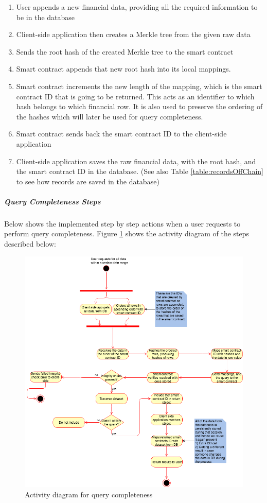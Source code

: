 \begin{enumerate}
	\item User appends a new financial data, providing all the required information to be in the database
	\item Client-side application then creates a Merkle tree from the given raw data
	\item Sends the root hash of the created Merkle tree to the smart contract
	\item Smart contract appends that new root hash into its local mappings.
	\item Smart contract increments the new length of the mapping, which is the smart contract ID that is going to be returned. This acts as an identifier to which hash belongs to which financial row. It is also used to preserve the ordering of the hashes which will later be used for query completeness.
	\item Smart contract sends back the smart contract ID to the client-side application
	\item Client-side application saves the raw financial data, with the root hash, and the smart contract ID in the database. (See also Table \ref{table:recordsOffChain} to see how records are saved in the database)
\end{enumerate}

\subparagraph{Query Completeness Steps}
Below shows the implemented step by step actions when a user requests to perform query completeness. Figure \ref{fig:queryCompleteness} shows the activity diagram of the steps described below:

\begin{figure}[h]
	\centering
	\includegraphics[width=1.0\textwidth]{images/queryCompleteness.png}
	\caption{\label{fig:queryCompleteness}Activity diagram for query completeness}
\end{figure}


